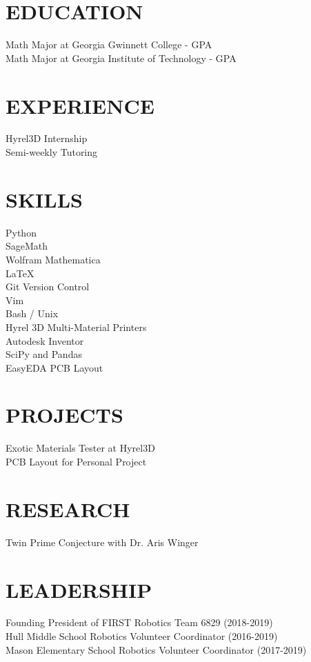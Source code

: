 \documentclass[margin, 10pt]{./res} %
\begin{document}
\begin{resume}

\section{EDUCATION}  
Math Major at Georgia Gwinnett College \quad -  GPA\\
Math Major at Georgia Institute of Technology \quad -  GPA
%
\section{EXPERIENCE}  
Hyrel3D Internship\\
Semi-weekly Tutoring

%
\section{SKILLS}  
Python\\
SageMath\\
Wolfram Mathematica\\
\LaTeX\\
Git Version Control\\
Vim\\
Bash / Unix\\
Hyrel 3D Multi-Material Printers\\
Autodesk Inventor\\
SciPy and Pandas\\
EasyEDA PCB Layout
%
\section{PROJECTS} 
Exotic Materials Tester at Hyrel3D\\
PCB Layout for Personal Project\\
% 
\section{RESEARCH} 
Twin Prime Conjecture with Dr. Aris Winger
%
\section{LEADERSHIP} 
Founding President of FIRST Robotics Team 6829 (2018-2019)\\
Hull Middle School Robotics Volunteer Coordinator (2016-2019)\\
Mason Elementary School Robotics Volunteer Coordinator (2017-2019)
%
\end{resume}
\end{document}
